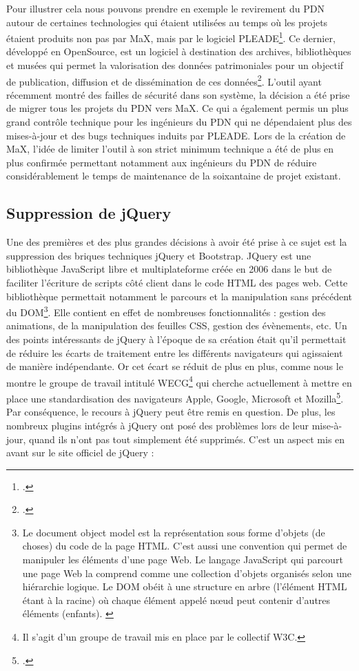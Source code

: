 \documentclass[a4paper,12pt,twoside]{book}
\begin{document}
Pour illustrer cela nous pouvons prendre en exemple le revirement du \acrshort{PDN} autour de certaines technologies qui étaient utilisées au temps où les projets étaient produits non pas par MaX, mais par le logiciel PLEADE\footcite{pleade}. Ce dernier, développé en OpenSource, est un logiciel à destination des archives, bibliothèques et musées qui permet la valorisation des données patrimoniales pour un objectif de publication, diffusion et de dissémination de ces données\footcite{pleade}. L'outil ayant récemment montré des failles de sécurité dans son système, la décision a été prise de migrer tous les projets du \acrshort{PDN} vers MaX. Ce qui a également permis un plus grand contrôle technique pour les ingénieurs du \acrshort{PDN} qui ne dépendaient plus des mises-à-jour et des bugs techniques induits par PLEADE. Lors de la création de MaX, l'idée de limiter l'outil à son strict minimum technique a été de plus en plus confirmée permettant notamment aux ingénieurs du \acrshort{PDN} de réduire considérablement le temps de maintenance de la soixantaine de projet existant.

\subsection{Suppression de jQuery}
Une des premières et des plus grandes décisions à avoir été prise à ce sujet est la suppression des briques techniques jQuery et Bootstrap. JQuery est une bibliothèque JavaScript libre et multiplateforme créée en 2006 dans le but de faciliter l'écriture de scripts côté client dans le code \acrshort{HTML} des pages web. Cette bibliothèque permettait notamment le parcours et la manipulation sans précédent du \acrfull{DOM}\footnote{Le document object model est la représentation sous forme d'objets (de choses) du code de la page \acrshort{HTML}. C'est aussi une convention qui permet de manipuler les éléments d'une page Web. Le langage JavaScript qui parcourt une page Web la comprend comme une collection d'objets organisés selon une hiérarchie logique. Le DOM obéit à une structure en arbre (l'élément \acrshort{HTML} étant à la racine) où chaque élément appelé n\oe{}ud peut contenir d'autres éléments (enfants). \cite{dom_2020}}. Elle contient en effet de nombreuses fonctionnalités : gestion des animations, de la manipulation des feuilles CSS, gestion des évènements, etc. Un des points intéressants de jQuery à l'époque de sa création était qu'il permettait de réduire les écarts de traitement entre les différents navigateurs qui agissaient de manière indépendante. Or cet écart se réduit de plus en plus, comme nous le montre le groupe de travail intitulé
\acrfull{WECG}\footnote{Il s'agit d'un groupe de travail mis en place par le collectif W3C.} qui cherche actuellement à mettre en place une standardisation des navigateurs Apple, Google, Microsoft et Mozilla\footcite{webextensions}. Par conséquence, le recours à jQuery peut être remis en question. De plus, les nombreux plugins intégrés à jQuery ont posé des problèmes lors de leur mise-à-jour, quand ils n'ont pas tout simplement été supprimés. C'est un aspect mis en avant sur le site officiel de jQuery :
\end{document}

